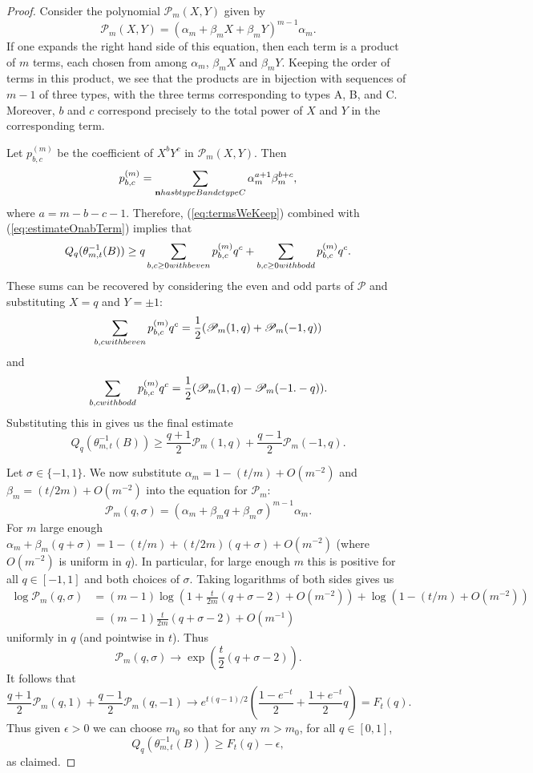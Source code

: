 \documentclass[10pt,a4paper]{amsart}
\begin{document}
\begin{proof}
Consider the polynomial $\mathscr{P}_{m}(X,Y)$ given by
\[
\mathscr{P}_{m}(X,Y)=(\alpha_{m}+\beta_{m}X+\beta_{m}Y)^{m-1}\alpha_{m}.
\]
If one expands the right hand side of this equation, then each term
is a product of $m$ terms, each chosen from among $\alpha_{m}$,
$\beta_{m}X$ and $\beta_{m}Y$. Keeping the order of terms in this
product, we see that the products are in bijection with sequences
of $m-1$ of three types, with the three terms corresponding to types
A, B, and C. Moreover, $b$ and $c$ correspond precisely to the total
power of $X$ and $Y$ in the corresponding term.

Let $p_{b,c}^{(m)}$ be the coefficient of $X^{b}Y^{c}$ in $\mathscr{P}_{m}(X,Y)$.
Then
\[
p_{b,c}^{(m)}=\sum_{\mathbf{n}\textrm{ has \ensuremath{b} type B and \ensuremath{c} type C}}\alpha_{m}^{a+1}\beta_{m}^{b+c},
\]
where $a=m-b-c-1.$ Therefore, (\ref{eq:termsWeKeep}) combined with
(\ref{eq:estimateOnabTerm}) implies that
\[
Q_{q}(\theta_{m,t}^{-1}(B))\geq q\sum_{b,c\geq0\textrm{ with \ensuremath{b} even}}p_{b,c}^{(m)}q^{c}+\sum_{b,c\geq0\textrm{ with \ensuremath{b} odd}}p_{b,c}^{(m)}q^{c}.
\]
These sums can be recovered by considering the even and odd parts
of $\mathscr{P}$ and substituting $X=q$ and $Y=\pm1$: 
\[
\sum_{b,c\textrm{ with \ensuremath{b} even}}p_{b,c}^{(m)}q^{c}=\frac{1}{2}(\mathscr{P}_{m}(1,q)+\mathscr{P}_{m}(-1,q))
\]
and
\[
\sum_{b,c\textrm{ with \ensuremath{b} odd}}p_{b,c}^{(m)}q^{c}=\frac{1}{2}(\mathscr{P}_{m}(1,q)-\mathscr{P}_{m}(-1.-q)).
\]
Substituting this in gives us the final estimate
\[
Q_{q}(\theta_{m,t}^{-1}(B))\geq\frac{q+1}{2}\mathscr{P}_{m}(1,q)+\frac{q-1}{2}\mathscr{P}_{m}(-1,q).
\]

Let $\sigma\in\{-1,1\}$. We now substitute $\alpha_{m}=1-(t/m)+O(m^{-2})$
and $\beta_{m}=(t/2m)+O(m^{-2})$ into the equation for $\mathscr{P}_{m}$:
\[
\mathscr{P}_{m}(q,\sigma)=(\alpha_{m}+\beta_{m}q+\beta_{m}\sigma)^{m-1}\alpha_{m}.
\]
For $m$ large enough $\alpha_{m}+\beta_{m}(q+\sigma)=1-(t/m)+(t/2m)(q+\sigma)+O(m^{-2})$
(where $O(m^{-2})$ is uniform in $q$). In particular, for large
enough $m$ this is positive for all $q\in[-1,1]$ and both choices
of $\sigma$. Taking logarithms of both sides gives us
\begin{align*}
\log\mathscr{P}_{m}(q,\sigma) & =(m-1)\log(1+\frac{t}{2m}(q+\sigma-2)+O(m^{-2}))+\log(1-(t/m)+O(m^{-2}))\\
 & =(m-1)\frac{t}{2m}(q+\sigma-2)+O(m^{-1})
\end{align*}
uniformly in $q$ (and pointwise in $t$). Thus
\[
\mathscr{P}_{m}(q,\sigma)\to\exp\left(\frac{t}{2}(q+\sigma-2)\right).
\]
It follows that
\[
\frac{q+1}{2}\mathscr{P}_{m}(q,1)+\frac{q-1}{2}\mathscr{P}_{m}(q,-1)\to e^{t(q-1)/2}\left(\frac{1-e^{-t}}{2}+\frac{1+e^{-t}}{2}q\right)=F_{t}(q).
\]
Thus given $\epsilon>0$ we can choose $m_{0}$ so that for any $m>m_{0}$,
for all $q\in[0,1]$, 
\[
Q_{q}(\theta_{m,t}^{-1}(B))\geq F_{t}(q)-\epsilon,
\]
as claimed.
\end{proof}
\end{document}
